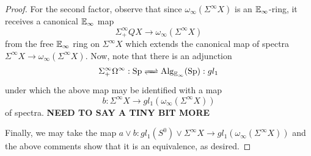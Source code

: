 \begin{proof}
For the second factor, observe that since $\omega_\infty (\Sigma^\infty X)$ is an $\operatorname{\mathbb{E}}_\infty$-ring, it receives a canonical $\operatorname{\mathbb{E}}_\infty$ map $$\Sigma^{\infty}_+ QX \longrightarrow \omega_\infty (\Sigma^\infty X)$$ from the free $\operatorname{\mathbb{E}}_\infty$ ring on $\Sigma^\infty X$ which extends the canonical map of spectra $\Sigma^\infty X \to \omega_\infty (\Sigma^\infty X).$  Now, note that there is an adjunction \cite{MQRT} $$\Sigma^{\infty}_+\Omega^\infty : \Sp \xrightleftharpoons{\quad} \Alg_{\E_\infty}(\Sp) : gl_1$$ under which the above map may be identified with a map $$b: \Sigma^\infty X \to gl_1 (\omega_\infty (\Sigma^{\infty} X))$$ of spectra.  \textbf{NEED TO SAY A TINY BIT MORE}


Finally, we may take the map $a\vee b: gl_1(S^0)\vee \Sigma^\infty X \to gl_1(\omega_\infty (\Sigma^{\infty} X))$ and the above comments show that it is an equivalence, as desired.  












\end{proof}